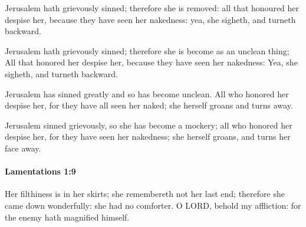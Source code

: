			Jerusalem hath grievously sinned; therefore she is removed: all that honoured her despise her, because they have seen her nakedness: yea, she sigheth, and turneth backward.

			\begin{versebox}
					\item[BHS] 
					\item[LXX] 
					\item[ASV] Jerusalem hath grievously sinned; therefore she is become as an unclean thing; All that honored her despise her, because they have seen her nakedness: Yea, she sigheth, and turneth backward.
					\item[NIV] Jerusalem has sinned greatly and so has become unclean. All who honored her despise her, for they have all seen her naked; she herself groans and turns away.
					\item[NRSV] Jerusalem sinned grievously, so she has become a mockery; all who honored her despise her, for they have seen her nakedness; she herself groans, and turns her face away.
			\end{versebox}

		\paragraph{Lamentations 1:9} %
			\label{LAMENTATIONS-1-9}

			Her filthiness is in her skirts; she remembereth not her last end; therefore she came down wonderfully: she had no comforter. O LORD, behold my affliction: for the enemy hath magnified himself.

